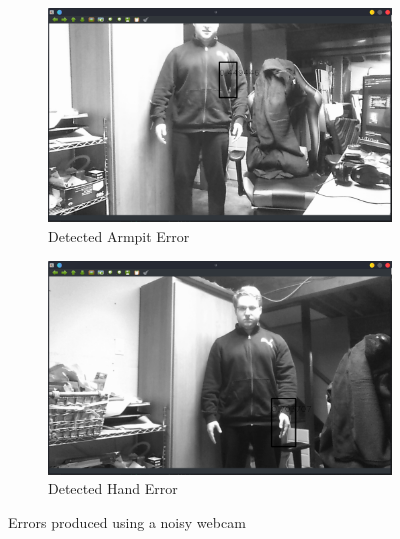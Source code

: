 \begin{figure}[H]
    \begin{subfigure}[b]{.49\textwidth}
    \centering
    \includegraphics[width=\textwidth]{figures/PT_webcam_armpit.png}
    \caption{Detected Armpit Error}
    \end{subfigure}\hfill
    \begin{subfigure}[b]{.49\textwidth}
    \centering
    \includegraphics[width=\textwidth]{figures/PT_webcam_hand.png}
    \caption{Detected Hand Error}
    \end{subfigure}%
    \caption{Errors produced using a noisy webcam}
\end{figure}



